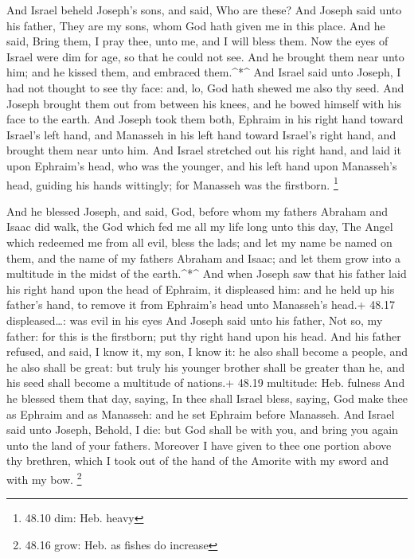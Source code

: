  And Israel beheld Joseph's sons, and said, Who are these?
 And Joseph said unto his father, They are my sons, whom God
hath given me in this place. And he said, Bring them, I pray thee, unto
me, and I will bless them.  Now the eyes of Israel were dim
for age, so that he could not see. And he brought them near unto him;
and he kissed them, and embraced them.\^{}*\^{}  And Israel
said unto Joseph, I had not thought to see thy face: and, lo, God hath
shewed me also thy seed.  And Joseph brought them out from
between his knees, and he bowed himself with his face to the earth.
 And Joseph took them both, Ephraim in his right hand
toward Israel's left hand, and Manasseh in his left hand toward Israel's
right hand, and brought them near unto him.  And Israel
stretched out his right hand, and laid it upon Ephraim's head, who was
the younger, and his left hand upon Manasseh's head, guiding his hands
wittingly; for Manasseh was the firstborn. \footnote{48.10 dim: Heb.
  heavy}

 And he blessed Joseph, and said, God, before whom my
fathers Abraham and Isaac did walk, the God which fed me all my life
long unto this day,  The Angel which redeemed me from all
evil, bless the lads; and let my name be named on them, and the name of
my fathers Abraham and Isaac; and let them grow into a multitude in the
midst of the earth.\^{}*\^{}  And when Joseph saw that his
father laid his right hand upon the head of Ephraim, it displeased him:
and he held up his father's hand, to remove it from Ephraim's head unto
Manasseh's head.+ 48.17 displeased\ldots: was evil in his eyes
 And Joseph said unto his father, Not so, my father: for
this is the firstborn; put thy right hand upon his head. 
And his father refused, and said, I know it, my son, I know it: he also
shall become a people, and he also shall be great: but truly his younger
brother shall be greater than he, and his seed shall become a multitude
of nations.+ 48.19 multitude: Heb. fulness  And he blessed
them that day, saying, In thee shall Israel bless, saying, God make thee
as Ephraim and as Manasseh: and he set Ephraim before Manasseh.
 And Israel said unto Joseph, Behold, I die: but God shall
be with you, and bring you again unto the land of your fathers.
 Moreover I have given to thee one portion above thy
brethren, which I took out of the hand of the Amorite with my sword and
with my bow. \footnote{48.16 grow: Heb. as fishes do increase}

